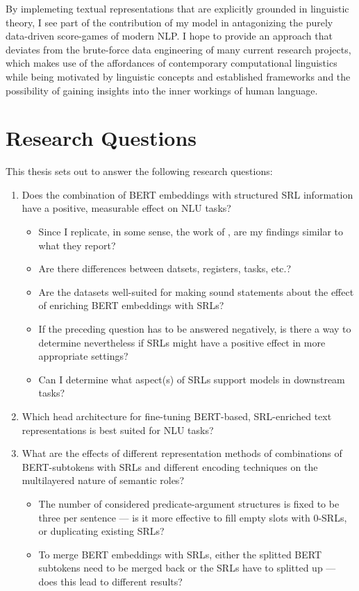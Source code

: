 By implemeting textual representations that are explicitly grounded in linguistic theory, I
see part of the contribution of my model in antagonizing the purely data-driven score-games of
modern NLP. I hope to provide an approach that deviates from the brute-force data engineering of
many current research projects, which makes use of the affordances of contemporary computational
linguistics while being motivated by linguistic concepts and established frameworks and the
possibility of gaining insights into the inner workings of human language.


\section{Research Questions}

This thesis sets out to answer the following research questions:

\begin{enumerate}
  \item \label{ques:one} Does the combination of  BERT embeddings with structured SRL information have a positive,
                         measurable effect on NLU tasks?
    \begin{itemize}
      \item Since I replicate, in some sense, the work of \cite{zhang2019semantics}, are my findings similar to what they report?
      \item Are there differences between datsets, registers, tasks, etc.?
      \item Are the datasets well-suited for making sound statements about the effect of enriching BERT embeddings with SRLs?
      \item If the preceding question has to be answered negatively, is there a way to determine nevertheless if SRLs might have a positive effect in more appropriate settings?
      \item Can I determine what aspect(s) of SRLs support models in downstream tasks?
    \end{itemize}
  \item \label{ques:two} Which head architecture for fine-tuning BERT-based, SRL-enriched text representations is best suited for
                          NLU tasks?
  \item \label{ques:three} What are the effects of different representation methods of combinations of BERT-subtokens with SRLs and different encoding techniques on the multilayered nature of semantic roles?
    \begin{itemize}
      \item The number of considered predicate-argument
            structures is fixed to be three per sentence --- is it more effective to fill empty slots with
            0-SRLs, or duplicating existing SRLs?
      \item To merge BERT embeddings with SRLs, either
            the splitted BERT subtokens need to be merged back or the SRLs have to splitted up --- does
            this lead to different results?
    \end{itemize}

\end{enumerate}




